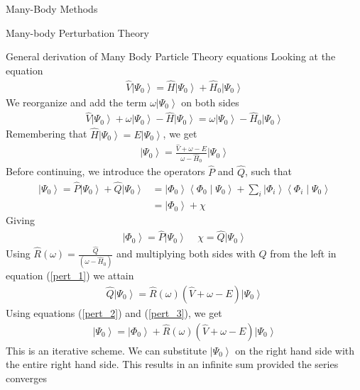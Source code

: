 \documentclass[twoside,english]{uiofysmaster}
\begin{document}
\begin{chapter}{Many-Body Methods}
\begin{section}{Many-body Perturbation Theory}
	 	\begin{subsection}{General derivation of Many Body Particle Theory equations}
	 		Looking at the equation
	 		\begin{align}
	 			\hat V \left| \Psi_0 \right> = \hat H \left| \Psi_0 \right> + \hat H_0 \left| \Psi_0 \right> 
	 		\end{align}
	 		We reorganize and add the term $\omega \left| \Psi_0 \right>$ on both sides
	 		\begin{align}
	 			\hat V \left| \Psi_0 \right> + \omega \left| \Psi_0 \right> - \hat H \left| \Psi_0 \right> = \omega \left| \Psi_0 \right> - \hat H_0 \left| \Psi_0 \right> 
	 		\end{align}
	 		Remembering that $\hat H \left| \Psi_0 \right> = E\left| \Psi_0 \right> $, we get 
	 		\begin{align}
	 			\left| \Psi_0 \right> = \frac{ \hat V + \omega - E }{\omega - \hat H_0} \left| \Psi_0 \right>
	 			\label{pert_1}
	 		\end{align}
	 		Before continuing, we introduce the operators $\hat P$ and $\hat Q$, such that
	 		\begin{align}
	 			\left| \Psi_0 \right> = \hat P \left| \Psi_0 \right> + \hat Q \left| \Psi_0 \right> 
	 			&= \left| \Phi_0 \right> \left< \Phi_0 \middle| \Psi_0 \right> + \sum_i \left| \Phi_i \right> \left< \Phi_i \middle| \Psi_0 \right> 
	 			\label{pert_2} \\
	 			&= \left| \Phi_0 \right> + \chi
	 		\end{align}
	 		Giving
	 		\begin{align}
	 			\left| \Phi_0 \right> = \hat P \left| \Psi_0 \right> \;\;\;\; \chi = \hat Q \left| \Psi_0 \right> 
	 			\label{pert_3}
	 		\end{align}
	 		Using $\hat R(\omega) = \frac{\hat{Q}}{\left( \omega - \hat H_0 \right)}$ and multiplying both sides with $\hat Q$ from the left in equation (\ref{pert_1}) we attain
	 		\begin{align}
	 			\hat Q \left| \Psi_0 \right> = \hat R(\omega) \left( \hat V + \omega - E \right) \left| \Psi_0 \right>
	 		\end{align}
	 		Using equations (\ref{pert_2}) and (\ref{pert_3}), we get
	 		\begin{align}
	 			\left| \Psi_0 \right> = \left| \Phi_0 \right> + \hat R(\omega) \left( \hat V + \omega - E \right) \left| \Psi_0 \right>
	 		\end{align}
	 		This is an iterative scheme. We can substitute $\left| \Psi_0 \right>$ on the right hand side with the entire right hand side. This results in an infinite sum provided the series converges

\end{subsection}
\end{section}
\end{chapter}
\end{document}
